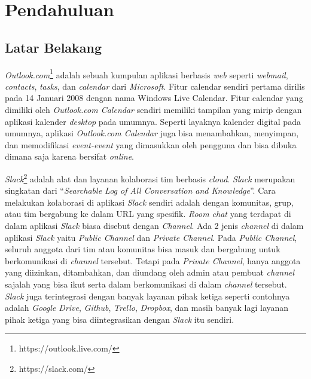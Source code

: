 \chapter{Pendahuluan}
\label{chap:intro}
   
\section{Latar Belakang}
\label{sec:label}

\textit{Outlook.com}\footnote{https://outlook.live.com/} adalah sebuah kumpulan aplikasi berbasis \textit{web} seperti \textit{webmail}, \textit{contacts}, \textit{tasks}, dan \textit{calendar} dari \textit{Microsoft}. Fitur calendar sendiri pertama dirilis pada 14 Januari 2008 dengan nama Windows Live Calendar. Fitur calendar yang dimiliki oleh \textit{Outlook.com Calendar} sendiri memiliki tampilan yang mirip dengan aplikasi kalender \textit{desktop} pada umumnya. Seperti layaknya kalender digital pada umumnya, aplikasi \textit{Outlook.com Calendar} juga bisa menambahkan, menyimpan, dan memodifikasi \textit{event-event} yang dimasukkan oleh pengguna dan bisa dibuka dimana saja karena bersifat \textit{online}. 

\textit{Slack}\footnote{https://slack.com/} adalah alat dan layanan kolaborasi tim berbasis \textit{cloud}. \textit{Slack} merupakan singkatan dari ``\textit{Searchable Log of All Conversation and Knowledge}''. Cara melakukan kolaborasi di aplikasi \textit{Slack} sendiri adalah dengan komunitas, grup, atau tim bergabung ke dalam URL yang spesifik. \textit{Room chat} yang terdapat di dalam aplikasi \textit{Slack} biasa disebut dengan \textit{Channel}. Ada 2 jenis \textit{channel} di dalam aplikasi \textit{Slack} yaitu \textit{Public Channel} dan \textit{Private Channel}. Pada \textit{Public Channel}, seluruh anggota dari tim atau komunitas bisa masuk dan bergabung untuk berkomunikasi di \textit{channel} tersebut. Tetapi pada \textit{Private Channel}, hanya anggota yang diizinkan, ditambahkan, dan diundang oleh admin atau pembuat \textit{channel} sajalah yang bisa ikut serta dalam berkomunikasi di dalam \textit{channel} tersebut. \textit{Slack} juga terintegrasi dengan banyak layanan pihak ketiga seperti contohnya adalah \textit{Google Drive}, \textit{Github}, \textit{Trello}, \textit{Dropbox}, dan masih banyak lagi layanan pihak ketiga yang bisa diintegrasikan dengan \textit{Slack} itu sendiri. 

